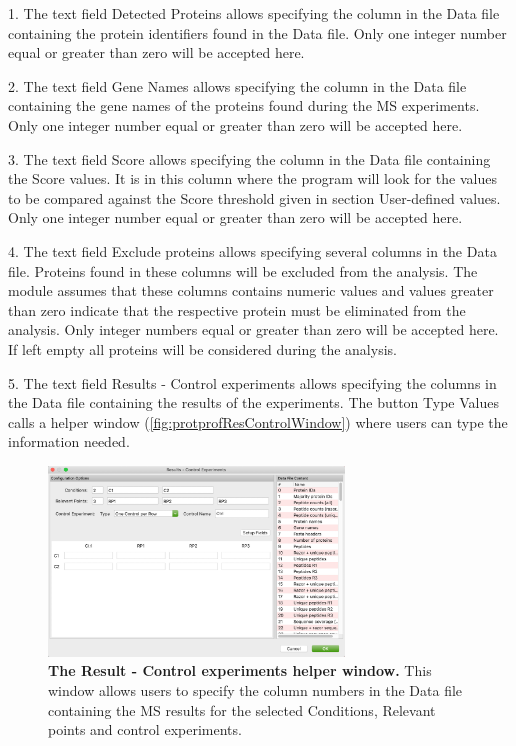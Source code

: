 \num{1}. The text field Detected Proteins allows specifying the column in
the Data file containing the protein identifiers found in the Data file. Only one
integer number equal or greater than zero will be accepted here. 

\num{2}. The text field Gene Names allows specifying the column in the Data
file containing the gene names of the proteins found during the MS experiments.
Only one integer number equal or greater than zero will be accepted here. 

\num{3}. The text field Score allows specifying the column in the Data file
containing the Score values. It is in this column where the program will look for
the values to be compared against the Score threshold given in section User-defined
values. Only one integer number equal or greater than zero will be accepted here. 

\num{4}. The text field Exclude proteins allows specifying several columns
in the Data file. Proteins found in these columns will be excluded from the analysis.
The module assumes that these columns contains numeric values and values greater
than zero indicate that the respective protein must be eliminated from the analysis.
Only integer numbers equal or greater than zero will be accepted here. If left empty
all proteins will be considered during the analysis. 

\num{5}. \label{par:protprofResultControl} The text field Results - Control experiments
allows specifying the columns in the Data file containing the results of the
experiments. The button Type Values calls a helper window (\autoref{fig:protprofResControlWindow})
where users can type the information needed.

\begin{figure}[h]
    \centering
    \includegraphics[width=0.7\textwidth]{./IMAGES/MOD-PROTPROF/protprof-rescontrol.jpg}
    \caption[The Result - Control experiments helper window]{\textbf{The Result -
    Control experiments helper window.} This window allows users to specify the column
    numbers in the Data file containing the MS results for the selected Conditions,
    Relevant points and control experiments.} 
    \label{fig:protprofResControlWindow}
    \vspace{-5pt}
\end{figure}


